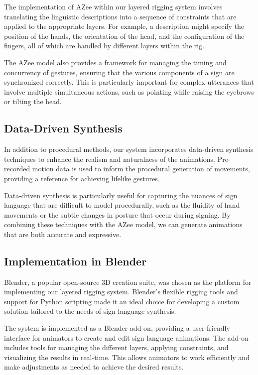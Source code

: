 \documentclass[../../main.tex]{subfiles}
\begin{document}
The implementation of AZee within our layered rigging system involves translating the linguistic descriptions into a sequence of constraints that are applied to the appropriate layers. For example, a description might specify the position of the hands, the orientation of the head, and the configuration of the fingers, all of which are handled by different layers within the rig.

The AZee model also provides a framework for managing the timing and concurrency of gestures, ensuring that the various components of a sign are synchronized correctly. This is particularly important for complex utterances that involve multiple simultaneous actions, such as pointing while raising the eyebrows or tilting the head.

\subsection{Data-Driven Synthesis}
In addition to procedural methods, our system incorporates data-driven synthesis techniques to enhance the realism and naturalness of the animations. Pre-recorded motion data is used to inform the procedural generation of movements, providing a reference for achieving lifelike gestures.

Data-driven synthesis is particularly useful for capturing the nuances of sign language that are difficult to model procedurally, such as the fluidity of hand movements or the subtle changes in posture that occur during signing. By combining these techniques with the AZee model, we can generate animations that are both accurate and expressive.

\subsection{Implementation in Blender}
Blender, a popular open-source 3D creation suite, was chosen as the platform for implementing our layered rigging system. Blender's flexible rigging tools and support for Python scripting made it an ideal choice for developing a custom solution tailored to the needs of sign language synthesis.

The system is implemented as a Blender add-on, providing a user-friendly interface for animators to create and edit sign language animations. The add-on includes tools for managing the different layers, applying constraints, and visualizing the results in real-time. This allows animators to work efficiently and make adjustments as needed to achieve the desired results.
\end{document}
